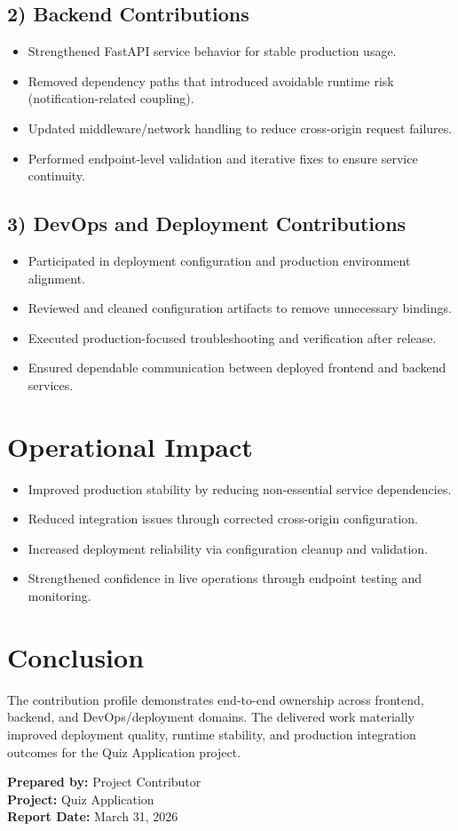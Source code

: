 \documentclass[11pt,a4paper]{article}
\begin{document}
\subsection*{2) Backend Contributions}
\begin{itemize}
    \item Strengthened FastAPI service behavior for stable production usage.
    \item Removed dependency paths that introduced avoidable runtime risk (notification-related coupling).
    \item Updated middleware/network handling to reduce cross-origin request failures.
    \item Performed endpoint-level validation and iterative fixes to ensure service continuity.
\end{itemize}

\subsection*{3) DevOps and Deployment Contributions}
\begin{itemize}
    \item Participated in deployment configuration and production environment alignment.
    \item Reviewed and cleaned configuration artifacts to remove unnecessary bindings.
    \item Executed production-focused troubleshooting and verification after release.
    \item Ensured dependable communication between deployed frontend and backend services.
\end{itemize}

\section*{Operational Impact}
\begin{itemize}
    \item Improved production stability by reducing non-essential service dependencies.
    \item Reduced integration issues through corrected cross-origin configuration.
    \item Increased deployment reliability via configuration cleanup and validation.
    \item Strengthened confidence in live operations through endpoint testing and monitoring.
\end{itemize}

\section*{Conclusion}
The contribution profile demonstrates end-to-end ownership across frontend, backend, and DevOps/deployment domains. The delivered work materially improved deployment quality, runtime stability, and production integration outcomes for the Quiz Application project.

\vspace{0.6cm}
\noindent\textbf{Prepared by:} Project Contributor\\
\textbf{Project:} Quiz Application\\
\textbf{Report Date:} March 31, 2026
\end{document}
